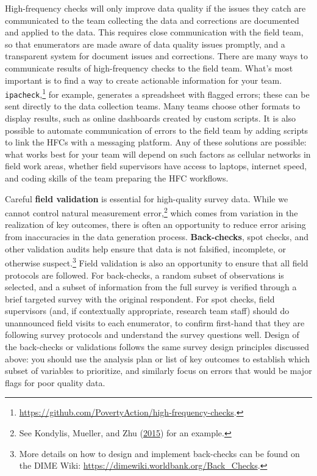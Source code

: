 \documentclass[
]{book}
\begin{document}
High-frequency checks will only improve data quality
if the issues they catch are communicated to the team collecting the data
and corrections are documented and applied to the data.
This requires close communication with the field team,
so that enumerators are made aware of data quality issues promptly,
and a transparent system for document issues and corrections.
There are many ways to communicate results of high-frequency checks to the field team.
What's most important is to find a way to create actionable information for your team.
\texttt{ipacheck},\footnote{\url{https://github.com/PovertyAction/high-frequency-checks}.}
for example, generates a spreadsheet with flagged errors;
these can be sent directly to the data collection teams.
Many teams choose other formats to display results,
such as online dashboards created by custom scripts.
It is also possible to automate communication of errors to the field team
by adding scripts to link the HFCs with a messaging platform.
Any of these solutions are possible:
what works best for your team will depend on such factors as
cellular networks in field work areas, whether field supervisors have access to laptops,
internet speed, and coding skills of the team preparing the HFC workflows.

Careful \textbf{field validation} is essential for high-quality survey data.
While we cannot control natural measurement error,\footnote{See Kondylis, Mueller, and Zhu (\protect\hyperlink{ref-kondylis2015measuring}{2015}) for an example.}
which comes from variation in the realization of key outcomes,
there is often an opportunity to reduce error arising from inaccuracies in the data generation process.
\textbf{Back-checks}, spot checks, and other validation audits help ensure that
data is not falsified, incomplete, or otherwise suspect.\footnote{More details on how to design and implement back-checks
  can be found on the DIME Wiki:
  \url{https://dimewiki.worldbank.org/Back_Checks}.}
Field validation is also an opportunity to ensure that all field protocols are followed.
For back-checks, a random subset of observations is selected,
and a subset of information from the full survey is
verified through a brief targeted survey with the original respondent.
For spot checks, field supervisors (and, if contextually appropriate, research team staff)
should do unannounced field visits to each enumerator,
to confirm first-hand that they are following survey protocols and
understand the survey questions well.
Design of the back-checks or validations follows the same survey design
principles discussed above: you should use the analysis plan
or list of key outcomes to establish which subset of variables to prioritize,
and similarly focus on errors that would be major flags for poor quality data.
\end{document}
